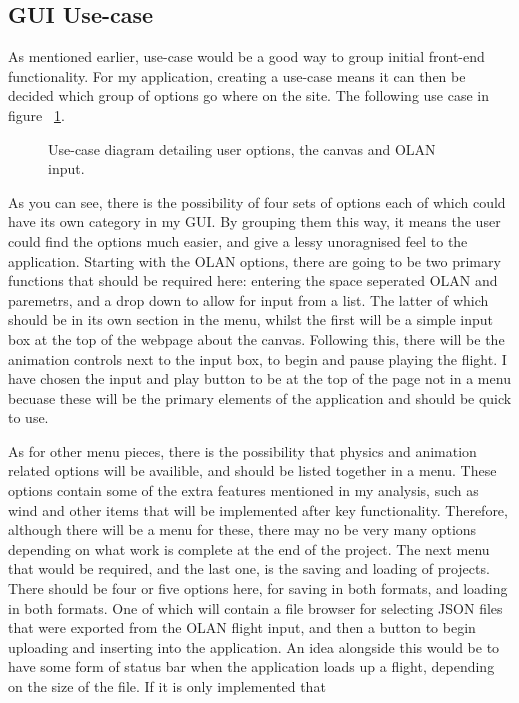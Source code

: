 \subsection{GUI Use-case}
As mentioned earlier, use-case would be a good way to group initial front-end functionality. For my application, creating a use-case means it can then be decided which group of options go where on the site. The following use case in figure ~\ref{fig:usecase}.

\begin{figure}[h!]
  \centering
  \caption{Use-case diagram detailing user options, the canvas and OLAN input.}
  \label{fig:usecase}
\end{figure}

As you can see, there is the possibility of four sets of options each of which could have its own category in my GUI. By grouping them this way, it means the user could find the options much easier, and give a lessy unoragnised feel to the application. Starting with the OLAN options, there are going to be two primary functions that should be required here: entering the space seperated OLAN and paremetrs, and a drop down to allow for input from a list. The latter of which should be in its own section in the menu, whilst the first will be a simple input box at the top of the webpage about the canvas. Following this, there will be the animation controls next to the input box, to begin and pause playing the flight. I have chosen the input and play button to be at the top of the page not in a menu becuase these will be the primary elements of the application and should be quick to use.

As for other menu pieces, there is the possibility that physics and animation related options will be availible, and should be listed together in a menu. These options contain some of the extra features mentioned in my analysis, such as wind and other items that will be implemented after key functionality. Therefore, although there will be a menu for these, there may no be very many options depending on what work is complete at the end of the project. The next menu that would be required, and the last one, is the saving and loading of projects. There should be four or five options here, for saving in both formats, and loading in both formats. One of which will contain a file browser for selecting JSON files that were exported from the OLAN flight input, and then a button to begin uploading and inserting into the application. An idea alongside this would be to have some form of status bar when the application loads up a flight, depending on the size of the file. If it is only implemented that 

